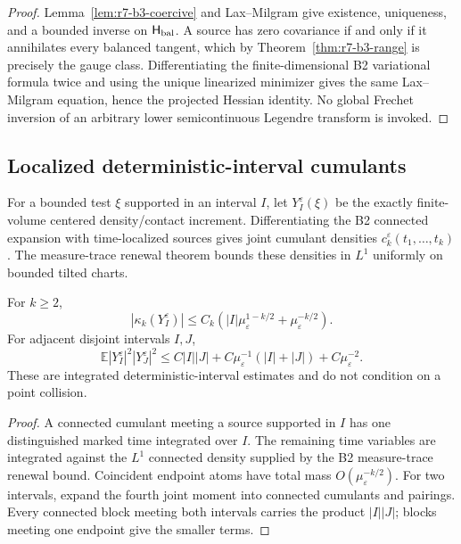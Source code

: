 \begin{proof}
Lemma~\ref{lem:r7-b3-coercive} and Lax--Milgram give existence, uniqueness,
and a bounded inverse on $\mathsf H_{\rm bal}$.  A source has zero covariance
if and only if it annihilates every balanced tangent, which by
Theorem~\ref{thm:r7-b3-range} is precisely the gauge class.  Differentiating
the finite-dimensional B2 variational formula twice and using the unique
linearized minimizer gives the same Lax--Milgram equation, hence the projected
Hessian identity.  No global Frechet inversion of an arbitrary lower
semicontinuous Legendre transform is invoked.
\end{proof}

\subsection{Localized deterministic-interval cumulants}

For a bounded test $\xi$ supported in an interval $I$, let
$Y_I^\varepsilon(\xi)$ be the exactly finite-volume centered density/contact
increment.  Differentiating the B2 connected expansion with time-localized
sources gives joint cumulant densities $c_k^\varepsilon(t_1,\ldots,t_k)$.
The measure-trace renewal theorem bounds these densities in $L^1$ uniformly on
bounded tilted charts.

\begin{lemma}
\label{lem:r7-b3-cumulants}
For $k\ge2$,
\[
 |\kappa_k(Y_I^\varepsilon)|
 \le C_k\left(|I|\mu_\varepsilon^{1-k/2}
             +\mu_\varepsilon^{-k/2}\right).
\]
For adjacent disjoint intervals $I,J$,
\[
 \mathbb E|Y_I^\varepsilon|^2|Y_J^\varepsilon|^2
 \le C|I||J|+C\mu_\varepsilon^{-1}(|I|+|J|)
 +C\mu_\varepsilon^{-2}.
\]
These are integrated deterministic-interval estimates and do not condition on
a point collision.
\end{lemma}

\begin{proof}
A connected cumulant meeting a source supported in $I$ has one distinguished
marked time integrated over $I$.  The remaining time variables are integrated
against the $L^1$ connected density supplied by the B2 measure-trace renewal
bound.  Coincident endpoint atoms have total mass
$O(\mu_\varepsilon^{-k/2})$.  For two intervals, expand the fourth joint moment
into connected cumulants and pairings.  Every connected block meeting both
intervals carries the product $|I||J|$; blocks meeting one endpoint give the
smaller terms.
\end{proof}

